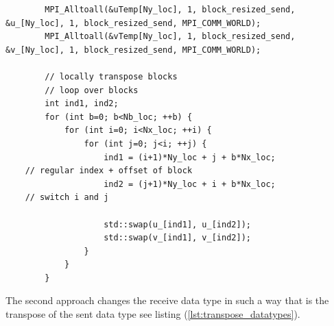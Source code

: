 \documentclass[11pt,a4paper]{article} %
\begin{document}
\begin{center}
\begin{verbatim}
        MPI_Alltoall(&uTemp[Ny_loc], 1, block_resized_send, 
&u_[Ny_loc], 1, block_resized_send, MPI_COMM_WORLD);
        MPI_Alltoall(&vTemp[Ny_loc], 1, block_resized_send, 
&v_[Ny_loc], 1, block_resized_send, MPI_COMM_WORLD);
        
        // locally transpose blocks
        // loop over blocks
        int ind1, ind2;
        for (int b=0; b<Nb_loc; ++b) {
            for (int i=0; i<Nx_loc; ++i) {
                for (int j=0; j<i; ++j) {
                    ind1 = (i+1)*Ny_loc + j + b*Nx_loc; 
	// regular index + offset of block
                    ind2 = (j+1)*Ny_loc + i + b*Nx_loc; 
	// switch i and j
                    
                    std::swap(u_[ind1], u_[ind2]);
                    std::swap(v_[ind1], v_[ind2]);
                }
            }
        }
\end{verbatim}
\end{center}

The second approach changes the receive data type in such a way that is the transpose of the sent data type see listing (\ref{lst:transpose_datatypes}).
\end{document}
